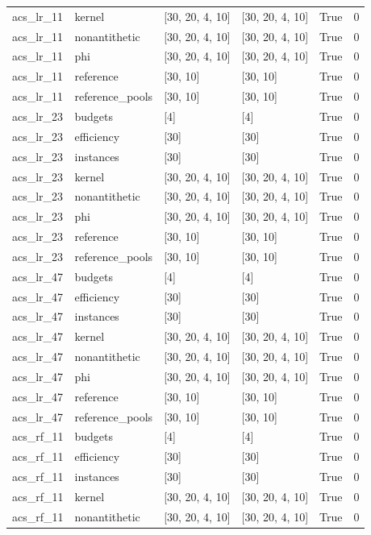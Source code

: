 \begin{tabular}{llllll}
acs\_lr\_11 & kernel & [30, 20, 4, 10] & [30, 20, 4, 10] & True & 0 \\
acs\_lr\_11 & nonantithetic & [30, 20, 4, 10] & [30, 20, 4, 10] & True & 0 \\
acs\_lr\_11 & phi & [30, 20, 4, 10] & [30, 20, 4, 10] & True & 0 \\
acs\_lr\_11 & reference & [30, 10] & [30, 10] & True & 0 \\
acs\_lr\_11 & reference\_pools & [30, 10] & [30, 10] & True & 0 \\
acs\_lr\_23 & budgets & [4] & [4] & True & 0 \\
acs\_lr\_23 & efficiency & [30] & [30] & True & 0 \\
acs\_lr\_23 & instances & [30] & [30] & True & 0 \\
acs\_lr\_23 & kernel & [30, 20, 4, 10] & [30, 20, 4, 10] & True & 0 \\
acs\_lr\_23 & nonantithetic & [30, 20, 4, 10] & [30, 20, 4, 10] & True & 0 \\
acs\_lr\_23 & phi & [30, 20, 4, 10] & [30, 20, 4, 10] & True & 0 \\
acs\_lr\_23 & reference & [30, 10] & [30, 10] & True & 0 \\
acs\_lr\_23 & reference\_pools & [30, 10] & [30, 10] & True & 0 \\
acs\_lr\_47 & budgets & [4] & [4] & True & 0 \\
acs\_lr\_47 & efficiency & [30] & [30] & True & 0 \\
acs\_lr\_47 & instances & [30] & [30] & True & 0 \\
acs\_lr\_47 & kernel & [30, 20, 4, 10] & [30, 20, 4, 10] & True & 0 \\
acs\_lr\_47 & nonantithetic & [30, 20, 4, 10] & [30, 20, 4, 10] & True & 0 \\
acs\_lr\_47 & phi & [30, 20, 4, 10] & [30, 20, 4, 10] & True & 0 \\
acs\_lr\_47 & reference & [30, 10] & [30, 10] & True & 0 \\
acs\_lr\_47 & reference\_pools & [30, 10] & [30, 10] & True & 0 \\
acs\_rf\_11 & budgets & [4] & [4] & True & 0 \\
acs\_rf\_11 & efficiency & [30] & [30] & True & 0 \\
acs\_rf\_11 & instances & [30] & [30] & True & 0 \\
acs\_rf\_11 & kernel & [30, 20, 4, 10] & [30, 20, 4, 10] & True & 0 \\
acs\_rf\_11 & nonantithetic & [30, 20, 4, 10] & [30, 20, 4, 10] & True & 0 \\

\end{tabular}
